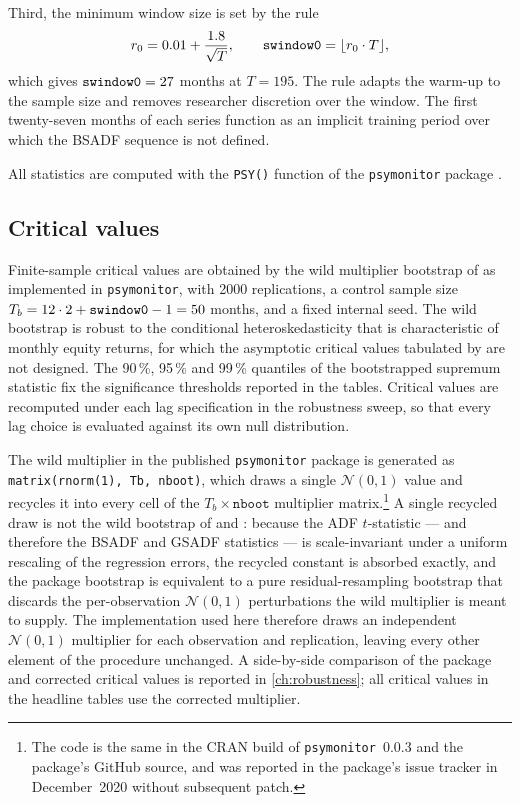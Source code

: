 Third, the minimum window size is set by the
\citet{phillipsWuYu2011, phillipsShiYu2015a} rule
\begin{equation}
\label{eq:bubble-swindow}
r_0 = 0.01 + \frac{1.8}{\sqrt{T}},
\qquad
\textrm{\texttt{swindow0}} = \lfloor r_0 \cdot T \rfloor,
\end{equation}
which gives $\textrm{\texttt{swindow0}} = 27$ months at $T = 195$. The
rule adapts the warm-up to the sample size and removes researcher
discretion over the window. The first twenty-seven months of each
series function as an implicit training period over which the BSADF
sequence is not defined.
 
All statistics are computed with the \texttt{PSY()} function of the
\texttt{psymonitor} package \citep{caspiPhillipsShi2018}.
 
 
\subsection{Critical values}
\label{subsec:bubble-critical-values}
 
Finite-sample critical values are obtained by the wild multiplier
bootstrap of \citet{harveyEtAl2016} as implemented in
\texttt{psymonitor}, with \num{2000} replications, a control sample
size $T_b = 12 \cdot 2 + \textrm{\texttt{swindow0}} - 1 = 50$ months,
and a fixed internal seed. The wild bootstrap is robust to the
conditional heteroskedasticity that is characteristic of monthly
equity returns, for which the asymptotic critical values tabulated by
\citet{phillipsShiYu2015a} are not designed. The 90\,\%, 95\,\% and
99\,\% quantiles of the bootstrapped supremum statistic fix the
significance thresholds reported in the tables. Critical values are
recomputed under each lag specification in the robustness sweep, so
that every lag choice is evaluated against its own null distribution.
 
The wild multiplier in the published \texttt{psymonitor} package is
generated as \texttt{matrix(rnorm(1), Tb, nboot)}, which draws a
single $\mathcal{N}(0, 1)$ value and recycles it into every cell of
the $T_b \times \texttt{nboot}$ multiplier matrix.\footnote{The code
is the same in the CRAN build of \texttt{psymonitor}~0.0.3 and the
package's GitHub source, and was reported in the package's issue
tracker in December~2020 without subsequent patch.} A single recycled draw is not the wild bootstrap of \citet{mammen1993} and \citet{harveyEtAl2016}: because the ADF $t$-statistic --- and therefore the BSADF and GSADF statistics --- is scale-invariant under a uniform rescaling of the regression errors, the recycled constant is absorbed exactly, and the package bootstrap is equivalent to a pure residual-resampling bootstrap that discards the per-observation $\mathcal{N}(0, 1)$ perturbations the wild multiplier is meant to supply.
The implementation used here therefore draws an independent
$\mathcal{N}(0, 1)$ multiplier for each observation and replication,
leaving every other element of the procedure unchanged.
A side-by-side comparison of the package and corrected
critical values is reported in \cref{ch:robustness}; all critical
values in the headline tables use the corrected multiplier.
 
